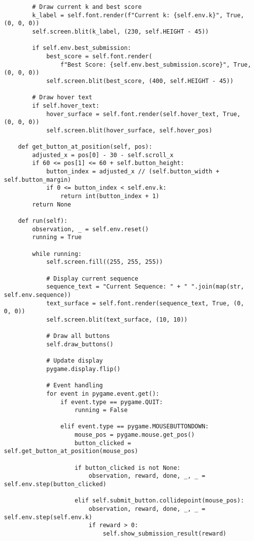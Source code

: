 \begin{lstlisting}
        # Draw current k and best score
        k_label = self.font.render(f"Current k: {self.env.k}", True, (0, 0, 0))
        self.screen.blit(k_label, (230, self.HEIGHT - 45))
        
        if self.env.best_submission:
            best_score = self.font.render(
                f"Best Score: {self.env.best_submission.score}", True, (0, 0, 0))
            self.screen.blit(best_score, (400, self.HEIGHT - 45))

        # Draw hover text
        if self.hover_text:
            hover_surface = self.font.render(self.hover_text, True, (0, 0, 0))
            self.screen.blit(hover_surface, self.hover_pos)

    def get_button_at_position(self, pos):
        adjusted_x = pos[0] - 30 - self.scroll_x
        if 60 <= pos[1] <= 60 + self.button_height:
            button_index = adjusted_x // (self.button_width + self.button_margin)
            if 0 <= button_index < self.env.k:
                return int(button_index + 1)
        return None

    def run(self):
        observation, _ = self.env.reset()
        running = True
        
        while running:
            self.screen.fill((255, 255, 255))
            
            # Display current sequence
            sequence_text = "Current Sequence: " + " ".join(map(str, self.env.sequence))
            text_surface = self.font.render(sequence_text, True, (0, 0, 0))
            self.screen.blit(text_surface, (10, 10))
            
            # Draw all buttons
            self.draw_buttons()
            
            # Update display
            pygame.display.flip()
            
            # Event handling
            for event in pygame.event.get():
                if event.type == pygame.QUIT:
                    running = False
                
                elif event.type == pygame.MOUSEBUTTONDOWN:
                    mouse_pos = pygame.mouse.get_pos()
                    button_clicked = self.get_button_at_position(mouse_pos)
                    
                    if button_clicked is not None:
                        observation, reward, done, _, _ = self.env.step(button_clicked)
                    
                    elif self.submit_button.collidepoint(mouse_pos):
                        observation, reward, done, _, _ = self.env.step(self.env.k)
                        if reward > 0:
                            self.show_submission_result(reward)
                    

\end{lstlisting}

